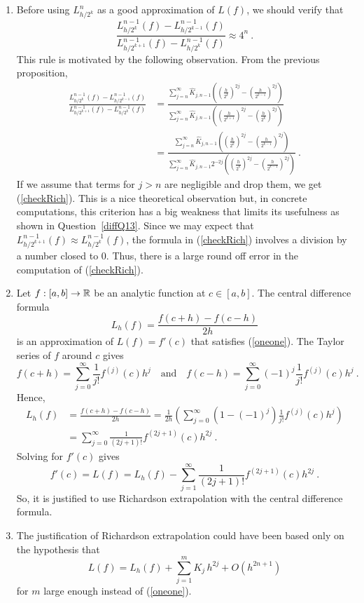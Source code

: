 \begin{rmkList}
\begin{enumerate}
\item Before using $L_{h/2^k}^n$ as a good approximation of $L(f)$, we
should verify that
\begin{equation} \label{checkRich}
\frac{L_{h/2^k}^{n-1}(f) -L_{h/2^{k-1}}^{n-1}(f)}
{L_{h/2^{k+1}}^{n-1}(f) -L_{h/2^k}^{n-1}(f)} \approx 4^n \ .
\end{equation}
This rule is motivated by the following observation.  From the previous
proposition,
\begin{align*}
\frac{\displaystyle L_{h/2^k}^{n-1}(f) -L_{h/2^{k-1}}^{n-1}(f)}
{\displaystyle L_{h/2^{k+1}}^{n-1}(f) -L_{h/2^k}^{n-1}(f)}
&= \frac{\displaystyle \sum_{j=n}^\infty \hat{K}_{j,n-1}
\left( \left(\frac{h}{2^k}\right)^{2j} -
\left(\frac{h}{2^{k-1}}\right)^{2j} \right)}
{\displaystyle \sum_{j=n}^\infty \hat{K}_{j,n-1}
\left( \left(\frac{h}{2^{k+1}}\right)^{2j} -
 \left(\frac{h}{2^k}\right)^{2j} \right)} \\
&= \frac{\displaystyle \sum_{j=n}^\infty \hat{K}_{j,n-1}
\left( \left(\frac{h}{2^k}\right)^{2j} -
\left(\frac{h}{2^{k-1}}\right)^{2j}\right)}
{\displaystyle \sum_{j=n}^\infty \hat{K}_{j,n-1} 2^{-2j}
\left( \left(\frac{h}{2^k}\right)^{2j} -
\left(\frac{h}{2^{k-1}}\right)^{2j}\right)} \ .
\end{align*}
If we assume that terms for $j>n$ are negligible and drop them, we get
(\ref{checkRich}).  This is a nice theoretical observation but, in
concrete computations, this criterion has a big weakness that limits
its usefulness as shown in Question~\ref{diffQ13}.
Since we may expect that $L_{h/2^{k+1}}^{n-1}(f) \approx L_{h/2^k}^{n-1}(f)$,
the formula in (\ref{checkRich}) involves a division by a number
closed to $0$.  Thus, there is a large round off error in the
computation of (\ref{checkRich}).

\item Let $f:[a,b] \rightarrow \mathbb{R}$ be an analytic function at
$c \in [a,b]$.  The central difference formula
\[
L_h(f) = \frac{f(c+h) - f(c-h)}{2h}
\]
is an approximation of $L(f) = f'(c)$ that satisfies
(\ref{oneone}).  The Taylor series of $f$ around $c$ gives
\[
f(c+h) = \sum_{j=0}^\infty \frac{1}{j!} f^{(j)}(c)h^j
\quad \text{and} \quad
f(c-h) = \sum_{j=0}^\infty (-1)^j\frac{1}{j!} f^{(j)}(c)h^j \ .
\]
Hence,
\begin{align*}
L_h(f) &= \frac{f(c+h) - f(c-h)}{2h} = \frac{1}{2h} \left(
\sum_{j=0}^\infty \left(1 - (-1)^j \right)\frac{1}{j!} f^{(j)}(c)h^j \right) \\
&= \sum_{j=0}^\infty \frac{1}{(2j+1)!} f^{(2j+1)}(c)h^{2j} \ .
\end{align*}
Solving for $f'(c)$ gives
\[
f'(c) = L(f) = L_h(f) - \sum_{j=1}^\infty \frac{1}{(2j+1)!}
f^{(2j+1)}(c)h^{2j}\ .
\]
So, it is justified to use Richardson extrapolation with the central
difference formula.
\item The justification of Richardson extrapolation could have been
based only on the hypothesis that
\[
L(f) = L_h(f) + \sum_{j=1}^m K_j\,h^{2j} + O(h^{2n+1})
\]
for $m$ large enough instead of (\ref{oneone}).
\end{enumerate}
\end{rmkList}

